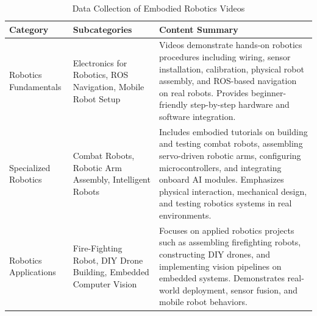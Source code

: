 \begin{table}[ht]
    \centering
    \caption{Data Collection of Embodied Robotics Videos}
    \begin{tabular}{p{3cm} p{3cm} p{7cm}}
        \toprule
        \textbf{Category} & \textbf{Subcategories} & \textbf{Content Summary} \\
        \midrule
        
        Robotics Fundamentals 
        & Electronics for Robotics, ROS Navigation, Mobile Robot Setup 
        & Videos demonstrate hands-on robotics procedures including wiring, sensor installation, calibration, physical robot assembly, and ROS-based navigation on real robots. Provides beginner-friendly step-by-step hardware and software integration. \\[6pt]
        
        Specialized Robotics
        & Combat Robots, Robotic Arm Assembly, Intelligent Robots 
        & Includes embodied tutorials on building and testing combat robots, assembling servo-driven robotic arms, configuring microcontrollers, and integrating onboard AI modules. Emphasizes physical interaction, mechanical design, and testing robotics systems in real environments. \\[6pt]
        
        Robotics Applications
        & Fire-Fighting Robot, DIY Drone Building, Embedded Computer Vision 
        & Focuses on applied robotics projects such as assembling firefighting robots, constructing DIY drones, and implementing vision pipelines on embedded systems. Demonstrates real-world deployment, sensor fusion, and mobile robot behaviors. \\
        
        \bottomrule
    \end{tabular}
    \label{tab:categorized_videos_emb}
\end{table}
         

